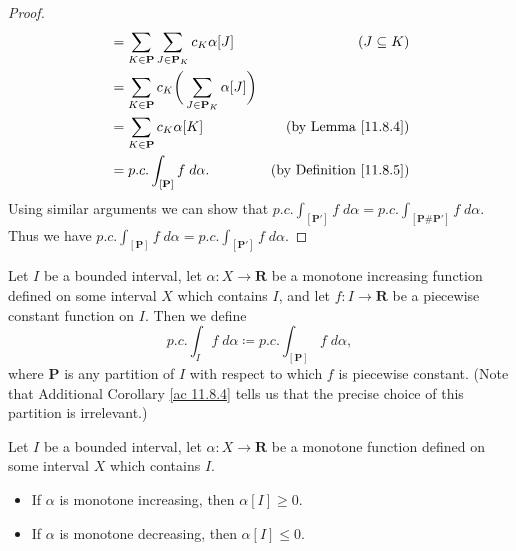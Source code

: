 \begin{proof}
\begin{align*}
                                                              & = \sum_{K \in \mathbf{P}} \sum_{J \in \mathbf{P}_K} c_K \alpha[J]             & (J \subseteq K)                         \\
                                                              & = \sum_{K \in \mathbf{P}} c_K \bigg(\sum_{J \in \mathbf{P}_K} \alpha[J]\bigg)                                           \\
                                                              & = \sum_{K \in \mathbf{P}} c_K \alpha[K]                                       & \text{(by Lemma \ref{11.8.4})}          \\
                                                              & = p.c. \int_{[\mathbf{P}]} f \; d \alpha.                                     & \text{(by Definition \ref{11.8.5})}
    \end{align*}
    Using similar arguments we can show that \(p.c. \int_{[\mathbf{P}']} f \; d \alpha = p.c. \int_{[\mathbf{P} \# \mathbf{P}']} f \; d \alpha\).
    Thus we have \(p.c. \int_{[\mathbf{P}]} f \; d \alpha = p.c. \int_{[\mathbf{P}']} f \; d \alpha\).
\end{proof}

\begin{additional corollary}\label{ac 11.8.5}
Let \(I\) be a bounded interval, let \(\alpha : X \to \mathbf{R}\) be a monotone increasing function defined on some interval \(X\) which contains \(I\), and let \(f : I \to \mathbf{R}\) be a piecewise constant function on \(I\).
Then we define
\[
    p.c. \int_I f \; d \alpha \coloneqq p.c. \int_{[\mathbf{P}]} f \; d \alpha,
\]
where \(\mathbf{P}\) is any partition of \(I\) with respect to which \(f\) is piecewise constant.
(Note that Additional Corollary \ref{ac 11.8.4} tells us that the precise choice of this partition is irrelevant.)
\end{additional corollary}

\begin{additional corollary}\label{ac 11.8.6}
Let \(I\) be a bounded interval, let \(\alpha : X \to \mathbf{R}\) be a monotone function defined on some interval \(X\) which contains \(I\).
\begin{itemize}
    \item If \(\alpha\) is monotone increasing, then \(\alpha[I] \geq 0\).
    \item If \(\alpha\) is monotone decreasing, then \(\alpha[I] \leq 0\).
\end{itemize}
\end{additional corollary}

